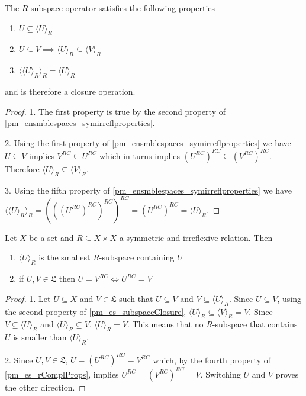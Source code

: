 \begin{coro}\label{pm_es_subspaceClosure}
	The $R$-subspace operator satisfies the following properties
	\begin{enumerate}
		\item $U \subseteq \langle U \rangle_R$
		\item $U \subseteq V \implies \langle U \rangle_R \subseteq \langle V \rangle_R$
		\item $\langle \langle U \rangle_R \rangle_R = \langle U \rangle_R $
	\end{enumerate}
	and is therefore a closure operation.
\end{coro}

\begin{proof}
	1. The first property is true by the second property of \ref{pm_ensmblespaces_symirreflproperties}.
	
	2. Using the first property of \ref{pm_ensmblespaces_symirreflproperties} we have $U \subseteq V$ implies $V^{RC} \subseteq U^{RC}$ which in turns implies $(U^{RC})^{RC} \subseteq (V^{RC})^{RC}$. Therefore $\langle U \rangle_R \subseteq \langle V \rangle_R$.
	
	3. Using the fifth property of \ref{pm_ensmblespaces_symirreflproperties} we have $\langle \langle U \rangle_R \rangle_R = (((U^{RC})^{RC})^{RC})^{RC} = (U^{RC})^{RC} = \langle U \rangle_R$.
\end{proof}

\begin{prop}
	Let $X$ be a set and $R \subseteq X \times X$ a symmetric and irreflexive relation. Then
	\begin{enumerate}
		\item $\langle U \rangle_R$ is the smallest $R$-subspace containing $U$
		\item if $U, V \in \mathfrak{L}$ then $U = V^{RC} \iff U^{RC} = V$
	\end{enumerate}
\end{prop}

\begin{proof}
	1. Let $U \subseteq X$ and $V \in \mathfrak{L}$ such that $U \subseteq V$ and $V \subseteq \langle U \rangle_R$. Since $U \subseteq V$, using the second property of \ref{pm_es_subspaceClosure}, $\langle U \rangle_R \subseteq \langle V \rangle_R = V$. Since $V \subseteq \langle U \rangle_R$ and  $\langle U \rangle_R \subseteq  V$, $\langle U \rangle_R = V$. This means that no $R$-subspace that contains $U$ is smaller than $\langle U \rangle_R$.
	
	2. Since $U, V \in \mathfrak{L}$, $U = (U^{RC})^{RC} = V^{RC}$ which, by the fourth property of \ref{pm_es_rComplProps}, implies $U^{RC} = (V^{RC})^{RC} = V$. Switching $U$ and $V$ proves the other direction.
\end{proof}

